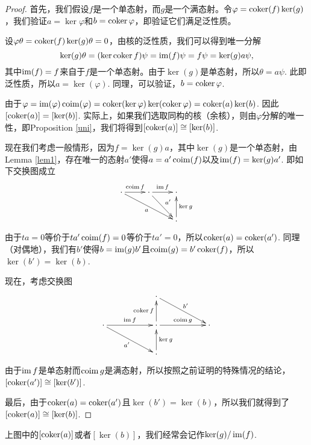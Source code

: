 \begin{proof}
首先，我们假设$f$是一个单态射，而$g$是一个满态射。令$\varphi=\operatorname{coker} (f) \ker (g)$，我们验证$a=\ker \varphi$和$b=\operatorname{coker} \varphi$，即验证它们满足泛性质。

设$\varphi \theta=\operatorname{coker} (f)\ker(g)\theta=0$，由核的泛性质，我们可以得到唯一分解
\[
	\ker(g)\theta=(\ker \operatorname{coker} f)\psi=\operatorname{im}(f)\psi=f\psi=\ker(g)a\psi,
\]
其中$\operatorname{im}(f)=f$来自于$f$是一个单态射。由于$\ker(g)$是单态射，所以$\theta=a\psi$. 此即泛性质，所以$a=\ker(\varphi)$. 同理，可以验证，$b=\operatorname{coker} \varphi$.

由于$\varphi=\operatorname{im}(\varphi)\operatorname{coim}(\varphi)=\operatorname{coker}(\ker \varphi)\ker(\operatorname{coker} \varphi)=\operatorname{coker}(a)\ker(b)$. 因此$[\operatorname{coker}(a)]=[\ker(b)]$. 实际上，如果我们选取同构的核（余核），则由$\varphi$分解的唯一性，即Proposition \ref{uni}，我们将得到$[\operatorname{coker}(a)]\cong [\ker(b)]$.

现在我们考虑一般情形，因为$f=\ker(g)a$，其中$\ker(g)$是一个单态射，由Lemma \ref{lem1}，存在唯一的态射$a'$使得$a=a'\operatorname{coim}(f)$以及$\operatorname{im}(f)=\ker(g)a'$. 即如下交换图成立
\[
\begin{xy}
	\xymatrix{
	\cdot \ar[r]^{\coim f} \ar[rrd]_a&\cdot \ar[r]^{\im f} \ar[rd]^{a'}&\cdot \\
	&&\cdot \ar[u]_{\ker g}
	}
\end{xy}
\]
由于$ta=0$等价于$ta'\operatorname{coim}(f)=0$等价于$ta'=0$，所以$\operatorname{coker}(a)=\operatorname{coker}(a')$. 同理（对偶地），我们有$b'$使得$b=\operatorname{im}(g)b'$且$\operatorname{coim}(g)=b' \operatorname{coker}(f)$，所以$\ker(b')=\ker(b)$.

现在，考虑交换图
\[
\begin{xy}
	\xymatrix{
	&&\cdot \ar[rrd]^{b'}&&\\
	\cdot \ar[rr]^{\im f} \ar[rrd]_{a'}&&\cdot \ar[rr]^{\coim g}\ar[u]^{\coker f}&&\cdot\\
	&&\cdot \ar[u]_{\ker g}&&
	}
\end{xy}
\]
由于$\operatorname{im} f$是单态射而$\operatorname{coim} g$是满态射，所以按照之前证明的特殊情况的结论，$[\operatorname{coker}(a')]\cong [\ker(b')]$. 

最后，由于$\operatorname{coker}(a)=\operatorname{coker}(a')$且$\ker(b')=\ker(b)$，所以我们就得到了$[\operatorname{coker}(a)]\cong [\ker(b)]$.
\end{proof}

上图中的$[\operatorname{coker}(a)]$或者$[\ker(b)]$，我们经常会记作$\ker(g)/\operatorname{im}(f)$.